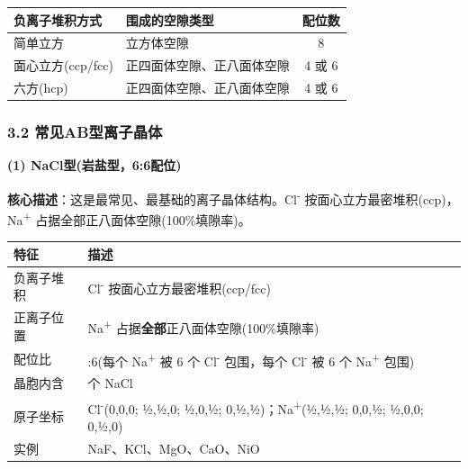 {\def\LTcaptype{none} %
\begin{longtable}[]{@{}llc@{}}
\toprule\noalign{}
负离子堆积方式 & 围成的空隙类型 & 配位数 \\
\midrule\noalign{}
\endhead
\bottomrule\noalign{}
\endlastfoot
简单立方 & 立方体空隙 & 8 \\
面心立方(ccp/fcc) & 正四面体空隙、正八面体空隙 & 4 或 6 \\
六方(hcp) & 正四面体空隙、正八面体空隙 & 4 或 6 \\
\end{longtable}
}

\subsubsection{3.2 常见AB型离子晶体}\label{ux5e38ux89c1abux578bux79bbux5b50ux6676ux4f53}

\textbf{(1) NaCl型(岩盐型，6:6配位)}

\textbf{核心描述}：这是最常见、最基础的离子晶体结构。Cl\textsuperscript{-} 按面心立方最密堆积(ccp)，Na\textsuperscript{+} 占据全部正八面体空隙(100\%填隙率)。

{\def\LTcaptype{none} %
\begin{longtable}[]{@{}
  >{\raggedright\arraybackslash}p{}
  >{\raggedright\arraybackslash}p{}@{}}
\toprule\noalign{}
\begin{minipage}[b]{\linewidth}\raggedright
特征
\end{minipage} & \begin{minipage}[b]{\linewidth}\raggedright
描述
\end{minipage} \\
\midrule\noalign{}
\endhead
\bottomrule\noalign{}
\endlastfoot
负离子堆积 & Cl\textsuperscript{-} 按面心立方最密堆积(ccp/fcc) \\
正离子位置 & Na\textsuperscript{+} 占据\textbf{全部}正八面体空隙(100\%填隙率) \\
配位比 & 6:6(每个 Na\textsuperscript{+} 被 6 个 Cl\textsuperscript{-} 包围，每个 Cl\textsuperscript{-} 被 6 个 Na\textsuperscript{+} 包围) \\
晶胞内含 & 4 个 NaCl \\
原子坐标 & Cl\textsuperscript{-}(0,0,0; ½,½,0; ½,0,½; 0,½,½)；Na\textsuperscript{+}(½,½,½; 0,0,½; ½,0,0; 0,½,0) \\
实例 & NaF、KCl、MgO、CaO、NiO \\
\end{longtable}
}

